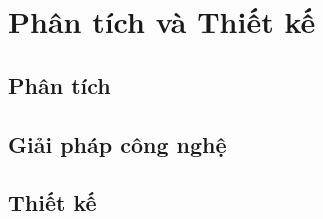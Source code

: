 \section{Phân tích và Thiết kế}
\subsection{Phân tích}


\subsection{Giải pháp công nghệ}










\subsection{Thiết kế}








